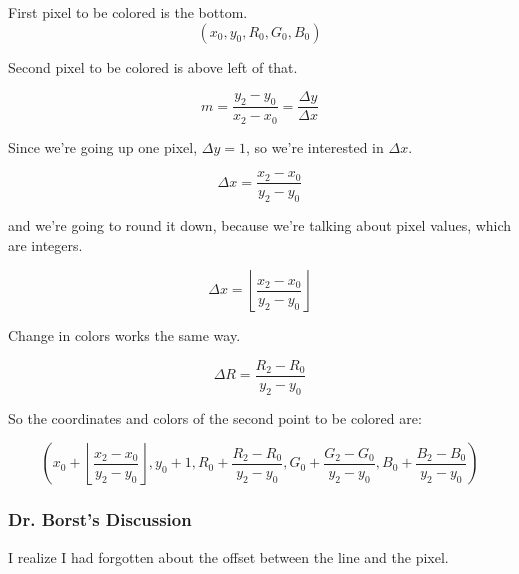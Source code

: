 \documentclass[11pt]{article}
\begin{document}
\begin{spacing}{1.2}
First pixel to be colored is the bottom.  
$$(x_0, y_0, R_0, G_0, B_0)$$

Second pixel to be colored is above left of that.  

$$m = \frac{y_2 - y_0}{x_2 - x_0} = \frac{\Delta y}{\Delta x}$$

Since we're going up one pixel, $\Delta y = 1$, so we're interested in $\Delta x$.  

$$\Delta x = \frac{x_2 - x_0}{y_2 - y_0}$$

and we're going to round it down, because we're talking about pixel values, which are integers.  

$$\Delta x = \left\lfloor\frac{x_2 - x_0}{y_2 - y_0}\right\rfloor$$

Change in colors works the same way.  

$$\Delta R = \frac{R_2 - R_0}{y_2 - y_0}$$

So the coordinates and colors of the second point to be colored are:

$$\left( x_0 + \left\lfloor\frac{x_2 - x_0}{y_2 - y_0}\right\rfloor, 
y_0 + 1, 
R_0 + \frac{R_2 - R_0}{y_2 - y_0},
G_0 + \frac{G_2 - G_0}{y_2 - y_0},
B_0 + \frac{B_2 - B_0}{y_2 - y_0}
\right)$$

\subsubsection{Dr. Borst's Discussion}

I realize I had forgotten about the offset between the line and the pixel.  

\end{spacing}
\end{document}
